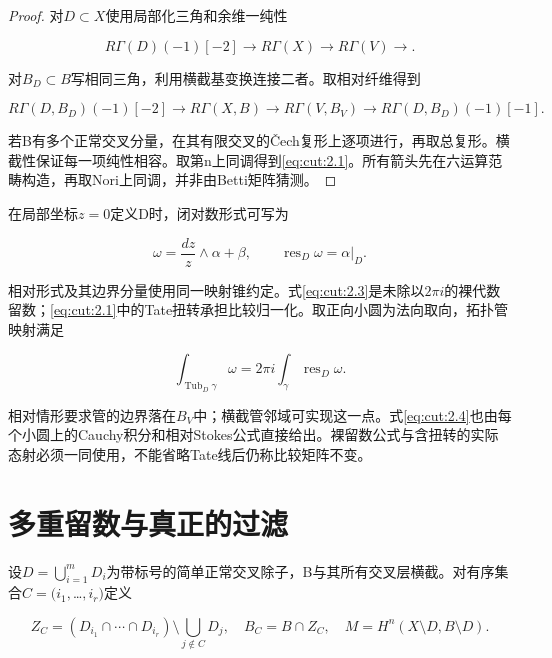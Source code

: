 \documentclass[11pt,a4paper,oneside]{ctexrep}
\theoremstyle{cnplain}
\theoremstyle{definition}
\theoremstyle{remark}
\begin{document}
\begin{proof}

对\(D\subset X\)使用局部化三角和余维一纯性

\begin{equation}
R\Gamma(D)(-1)[-2]\to R\Gamma(X)\to R\Gamma(V)\to.
\end{equation}

对\(B_D\subset B\)写相同三角，利用横截基变换连接二者。取相对纤维得到

\begin{equation}
R\Gamma(D,B_D)(-1)[-2]\to R\Gamma(X,B)
 \to R\Gamma(V,B_V)\to R\Gamma(D,B_D)(-1)[-1].         \label{eq:cut:2.2}
\end{equation}

若B有多个正常交叉分量，在其有限交叉的Čech复形上逐项进行，再取总复形。横截性保证每一项纯性相容。取第n上同调得到\eqref{eq:cut:2.1}。所有箭头先在六运算范畴构造，再取Nori上同调，并非由Betti矩阵猜测。

\end{proof}

在局部坐标\(z=0\)定义D时，闭对数形式可写为

\begin{equation}
\omega=\frac{dz}{z}\wedge\alpha+\beta,
 \qquad\operatorname{res}_D\omega=\alpha|_D.           \label{eq:cut:2.3}
\end{equation}

相对形式及其边界分量使用同一映射锥约定。式\eqref{eq:cut:2.3}是未除以\(2\pi i\)的裸代数留数；\eqref{eq:cut:2.1}中的Tate扭转承担比较归一化。取正向小圆为法向取向，拓扑管映射满足

\begin{equation}
\int_{\operatorname{Tub}_D\gamma}\omega
       =2\pi i\int_\gamma\operatorname{res}_D\omega.   \label{eq:cut:2.4}
\end{equation}

相对情形要求管的边界落在\(B_V\)中；横截管邻域可实现这一点。式\eqref{eq:cut:2.4}也由每个小圆上的Cauchy积分和相对Stokes公式直接给出。裸留数公式与含扭转的实际态射必须一同使用，不能省略Tate线后仍称比较矩阵不变。

\section{多重留数与真正的过滤}\label{sec:cut:3}

设\(D=\bigcup _{i=1}^m D_i\)为带标号的简单正常交叉除子，B与其所有交叉层横截。对有序集合\(C=(i_{1},\)\ldots{}\(,i_r)\)定义

\begin{equation}
Z_C=(D_{i_1}\cap\cdots\cap D_{i_r})
                         \setminus\bigcup_{j\notin C}D_j,
 \quad B_C=B\cap Z_C,
 \quad M=H^n(X\setminus D,B\setminus D).
\end{equation}
\end{document}
